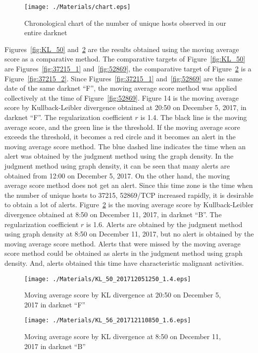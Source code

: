 \documentclass{sig-alternate-10pt}
\begin{document}
\begin{figure}[htb]
	\texttt{[image: ./Materials/chart.eps]}
	\caption{Chronological chart of the number of unique hosts observed in our entire darknet}
  	\label{fig:chart}
\end{figure}

Figures~\ref{fig:KL_50} and~\ref{fig:KL_56} are the results obtained using the moving average score as a comparative method.
The comparative targets of Figure~\ref{fig:KL_50} are Figures~\ref{fig:37215_1} and~\ref{fig:52869}, the comparative target of Figure~\ref{fig:KL_56} is a Figure~\ref{fig:37215_2}.
Since Figures~\ref{fig:37215_1} and~\ref{fig:52869} are the same date of the same darknet ``F'', the moving average score method was applied collectively at the time of Figure~\ref{fig:52869}.
Figure 14 is the moving average score by Kullback-Leibler divergence obtained at 20:50 on December 5, 2017, in darknet ``F''.
The regularization coefficient $r$ is 1.4.
The black line is the moving average score, and the green line is the threshold.
If the moving average score exceeds the threshold, it becomes a red circle and it becomes an alert in the moving average score method.
The blue dashed line indicates the time when an alert was obtained by the judgment method using the graph density.
In the judgment method using graph density, it can be seen that many alerts are obtained from 12:00 on December 5, 2017.
On the other hand, the moving average score method does not get an alert.
Since this time zone is the time when the number of unique hosts to 37215, 52869/TCP increased rapidly, it is desirable to obtain a lot of alerts.
Figure~\ref{fig:KL_56} is the moving average score by Kullback-Leibler divergence obtained at 8:50 on December 11, 2017, in darknet ``B''.
The regularization coefficient $r$ is 1.6.
Alerts are obtained by the judgment method using graph density at 8:50 on December 11, 2017, but no alert is obtained by the moving average score method.
Alerts that were missed by the moving average score method could be obtained as alerts in the judgment method using graph density.
And, alerts obtained this time have characteristic malignant activities.

\begin{figure}[htb]
\begin{center}
	\texttt{[image: ./Materials/KL\_50\_201712051250\_1.4.eps]}
	\caption{Moving average score by KL divergence at 20:50 on December 5, 2017 in darknet ``F''}
  	\label{fig:KL_50}
	\vspace*{0.5cm}
	\texttt{[image: ./Materials/KL\_56\_201712110850\_1.6.eps]}
	\caption{Moving average score by KL divergence at 8:50 on December 11, 2017 in darknet ``B''}
  	\label{fig:KL_56}
\end{center}
\end{figure}
\end{document}
